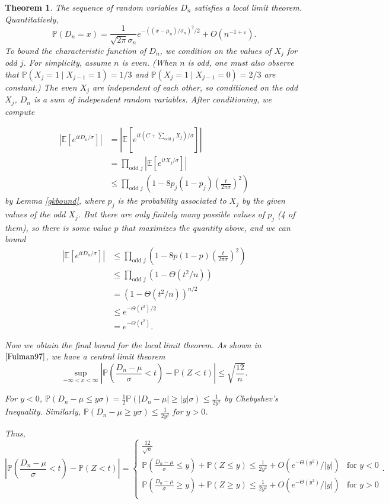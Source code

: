 \documentclass[12pt]{article} %
\newcommand{\f}[2]{\frac{#1}{#2}}
\newcommand{\p}[1]{\left(#1\right)}
\newcommand{\abs}[1]{\left\lvert#1\right\rvert}
\renewcommand{\P}{\mathbb{P}}
\newcommand{\E}{\mathbb{E}}
\newcommand{\eps}{\varepsilon}
\newtheorem{thm}{Theorem}[section]
\theoremstyle{definition}
\theoremstyle{definition}
\begin{document}
\begin{thm}
The sequence of random variables $D_n$ satisfies a local limit theorem. Quantitatively,
\[ \P(D_n = x) = \frac{1}{\sqrt{2\pi} \sigma_n} e^{-((x-\mu_n)/\sigma_n)^2/2} + O(n^{-1+\eps}). \]
\proof
	To bound the characteristic function of $D_n$, we condition on the values of $X_j$ for odd $j$. For simplicity, assume $n$ is even. (When $n$ is odd, one must also observe that $\P(X_j = 1 \mid X_{j-1} = 1) = 1/3$ and $\P(X_j = 1 \mid X_{j-1} = 0) = 2/3$ are constant.) The even $X_j$ are independent of each other, so conditioned on the odd $X_j$, $D_n$ is a sum of independent random variables. After conditioning, we compute
    
   	\begin{align*}
		\abs{\E[e^{itD_n/\sigma}]}
		&= \abs{\E[e^{it(C + \sum\limits_{\text{odd } j} X_j)/\sigma}]} \\
		&= \prod_{\text{odd } j} \abs{\E[e^{itX_j/\sigma}]} \\
        &\leq \prod_{\text{odd } j} \p{1 - 8p_j(1-p_j)\p{\frac{t}{2\pi\sigma}}^2}
	\end{align*}
    by Lemma \ref{gkbound}, where $p_j$ is the probability associated to $X_j$ by the given values of the odd $X_j$. But there are only finitely many possible values of $p_j$ (4 of them), so there is some value $p$ that maximizes the quantity above, and we can bound
	\begin{align*}
		\abs{\E[e^{itD_n/\sigma}]}
        &\leq \prod_{\text{odd } j} \p{1 - 8p(1-p)\p{\frac{t}{2\pi\sigma}}^2} \\
		&\leq \prod_{\text{odd } j} (1 - \Theta(t^2/n)) \\
		&= (1 - \Theta(t^2/n))^{n/2} \\
		&\leq e^{-\Theta(t^2)/2} \\
		&= e^{-\Theta(t^2)}.
	\end{align*}

	Now we obtain the final bound for the local limit theorem. As shown in $\cite{Fulman97}$, we have a central limit theorem 
\[ \sup_{ -\infty < x < \infty} \abs{\P\p{\f{D_n - \mu}{\sigma} < t} - \P(Z < t)} \leq \sqrt{\f{12}{n}}. \]

For $y<0$, $\P(D_n-\mu \leq y\sigma) = \frac{1}{2} \P(\abs{D_n-\mu} \geq \abs{y}\sigma) \leq \frac{1}{2y^2}$ by Chebyshev's Inequality. Similarly, $\P(D_n-\mu \geq y\sigma) \leq \frac{1}{2y^2}$ for $y>0$. 

Thus, \[\abs{\P\p{\f{D_n - \mu}{\sigma} < t} - \P(Z < t)} = \begin{cases} 
      \f{12}{\sqrt{n}} \\[10pt]
      \P(\f{D_n - \mu}{\sigma} \leq y) + \P(Z \leq y) \leq \frac{1}{2y^2} + O(e^{-\Theta(y^2)}/\abs{y}) & \text{for } y < 0 \\[10pt]
      \P(\f{D_n - \mu}{\sigma} \geq y) + \P(Z\geq y) \leq \frac{1}{2y^2} + O(e^{-\Theta(y^2)}/\abs{y}) & \text{for } y > 0 \\[10pt]
\end{cases}. \]


\end{thm}
\end{document}
